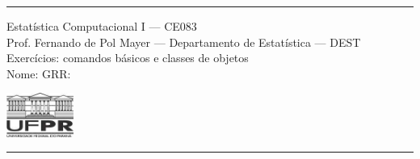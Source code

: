 \documentclass[a4paper,11pt,fleqn]{article}\usepackage[]{graphicx}\usepackage[]{color}
\theoremstyle{definition}
\begin{document}
\reversemarginpar %





\hrule
\vspace{0.3cm}



\begin{minipage}[c]{.85\textwidth}
  Estatística Computacional I --- CE083 \\
  Prof. Fernando de Pol Mayer --- Departamento de Estatística --- DEST \\
  Exercícios: comandos básicos e classes de objetos \\
  Nome:  \hfill GRR: \hspace{2cm}
\end{minipage}\hfill
\begin{minipage}[c]{.15\textwidth}
\flushright
\includegraphics[width=2.2cm]{../img/ufpr-logo2.jpg}
\end{minipage}

\vspace{0.3cm}
\hrule
\vspace{0.3cm}

\end{document}
